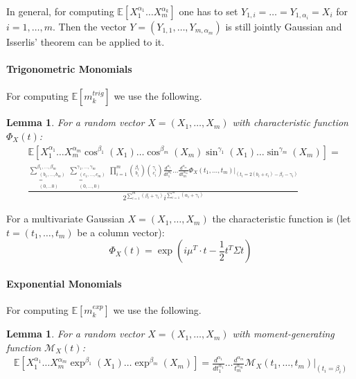 \documentclass{article}
\newtheorem{lem}[theorem]{Lemma}
\newcommand{\expc}[1]{\mathbb{E}\left[ #1 \right]}
\begin{document}
In general, for computing $\expc{X_1^{\alpha_1}\hdots X_m^{\alpha_k}}$ one has to set $Y_{1,i}=\hdots=Y_{1,\alpha_i}=X_i$ for $i=1, \hdots, m$. Then the vector $Y = (Y_{1,1}, \hdots, Y_{m,\alpha_m})$ is still jointly Gaussian and Isserlis' theorem can be applied to it.

\paragraph{Trigonometric Monomials}

For computing $\expc{m_k^{trig}}$ we use the following.

\begin{lem}
For a random vector $X = (X_1, \hdots, X_m)$ with characteristic function $\Phi_X(t)$:
\begin{align*}
    &\expc{X_1^{\alpha_1}\hdots X_m^{\alpha_m} \cos^{\beta_1}(X_1)\hdots\cos^{\beta_m}(X_m)\sin^{\gamma_1}(X_1)\hdots\sin^{\gamma_m}(X_m)} = \\
    &\frac{ \sum_{\substack{(b_1, \hdots, b_m)\\ = \\ (0, \hdots 0)}}^{\beta_1, \hdots, \beta_m} \sum_{\substack{(c_1, \hdots, c_m)\\ = \\  (0, \hdots, 0)}}^{\gamma_1, \hdots, \gamma_m} \prod_{i=1}^m \binom{\beta_i}{b_i} \binom{\gamma_i}{c_i} \frac{d^{\alpha_1}}{dt_1^{\alpha_1}} \hdots \frac{d^{\alpha_m}}{dt_m^{\alpha_m}} \Phi_X(t_1, \hdots, t_m)\Bigg|_{(t_i = 2(b_i + c_i) - \beta_i - \gamma_i)} }{2^{\sum_{i=1}^m (\beta_i + \gamma_i)}i^{\sum_{i=1}^m (\alpha_i + \gamma_i)}}
\end{align*}
\end{lem}

For a multivariate Gaussian $X = (X_1, \hdots, X_m)$ the characteristic function is (let $t = (t_1, \hdots, t_m)$ be a column vector):
$$\Phi_X(t) = \exp\left(i \mu^T \cdot t - \frac{1}{2} t^T \Sigma t\right)$$

\paragraph{Exponential Monomials}

For computing $\expc{m_k^{exp}}$ we use the following.

\begin{lem}
For a random vector $X = (X_1, \hdots, X_m)$ with moment-generating function $\mathcal{M}_X(t)$:
\begin{align*}
\expc{X_1^{\alpha_1}\hdots X_m^{\alpha_m}\exp^{\beta_1}(X_1)\hdots\exp^{\beta_m}(X_m)} = \frac{d^{\alpha_1}}{dt_1^{\alpha_1}} \hdots \frac{d^{\alpha_m}}{t_m^{\alpha_m}} \mathcal{M}_X(t_1, \hdots, t_m) \Bigg|_{(t_i = \beta_i)}
\end{align*}
\end{lem}
\end{document}
